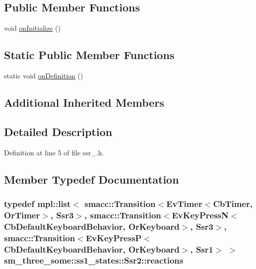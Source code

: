 \subsection*{Public Member Functions}
\begin{DoxyCompactItemize}
\item 
void \hyperlink{structsm__three__some_1_1ss1__states_1_1Ssr2_a1155fae6175fec6622c4336967512e56}{on\+Initialize} ()
\end{DoxyCompactItemize}
\subsection*{Static Public Member Functions}
\begin{DoxyCompactItemize}
\item 
static void \hyperlink{structsm__three__some_1_1ss1__states_1_1Ssr2_a824371350a20ff9e482a25d65d87d8aa}{on\+Definition} ()
\end{DoxyCompactItemize}
\subsection*{Additional Inherited Members}


\subsection{Detailed Description}


Definition at line 5 of file ssr\+\_.\+h.



\subsection{Member Typedef Documentation}
\subsubsection[{\texorpdfstring{reactions}{reactions}}]{\setlength{\rightskip}{0pt plus 5cm}typedef mpl\+::list$<$ {\bf smacc\+::\+Transition}$<$Ev\+Timer$<$Cb\+Timer, {\bf Or\+Timer}$>$, {\bf Ssr3}$>$, {\bf smacc\+::\+Transition}$<$Ev\+Key\+PressN$<$Cb\+Default\+Keyboard\+Behavior, {\bf Or\+Keyboard}$>$, {\bf Ssr3}$>$, {\bf smacc\+::\+Transition}$<$Ev\+Key\+PressP$<$Cb\+Default\+Keyboard\+Behavior, {\bf Or\+Keyboard}$>$, {\bf Ssr1}$>$ $>$ {\bf sm\+\_\+three\+\_\+some\+::ss1\+\_\+states\+::\+Ssr2\+::reactions}}\hypertarget{structsm__three__some_1_1ss1__states_1_1Ssr2_ace967d354888d5ed4b12f987c6357843}{}\label{structsm__three__some_1_1ss1__states_1_1Ssr2_ace967d354888d5ed4b12f987c6357843}


